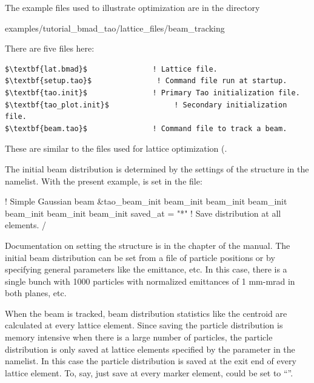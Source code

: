 \documentclass{hitec}     %
\begin{document}
{The example files used to illustrate optimization are in the directory 
\begin{code}
examples/tutorial_bmad_tao/lattice_files/beam_tracking
\end{code}
There are five files here:
\begin{lstlisting}[mathescape]
$\textbf{lat.bmad}$               ! Lattice file.
$\textbf{setup.tao}$               ! Command file run at startup.
$\textbf{tao.init}$               ! Primary Tao initialization file.
$\textbf{tao_plot.init}$               ! Secondary initialization file.
$\textbf{beam.tao}$               ! Command file to track a beam.
\end{lstlisting}
These are similar to the files used for lattice optimization (.

The initial beam distribution is determined by the settings of the  
structure in the  namelist. With the present example,  is 
set in the  file:
\begin{code}
! Simple Gaussian beam 
&tao_beam_init
  beam_init%
  beam_init%
  beam_init%
  beam_init%
  beam_init%
  beam_init%
  saved_at =  "*"                 ! Save distribution at all elements. 
/
\end{code}
Documentation on setting the  structure is in the  
chapter of the \bmad manual. The initial beam distribution can be set from a file of
particle positions or by specifying general parameters like the emittance, etc. In this case,
there is a single bunch with 1000 particles with normalized emittances of 1 mm-mrad in both
planes, etc. 

When the beam is tracked, beam distribution statistics like the centroid are calculated at every
lattice element. Since saving the particle distribution is memory intensive when there is a large
number of particles, the particle distribution is only saved at lattice elements specified
by the  parameter in the  namelist. In this case the 
particle distribution is saved at the exit end of every lattice element. To, say, just save
at every marker element,  could be set to ``''.

}
\end{document}
